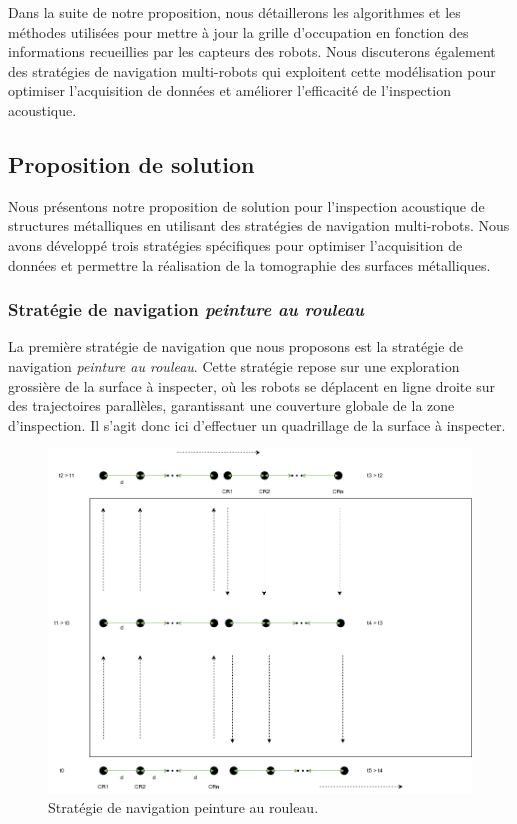 \documentclass[francais,RandD]{rapportPFE}
\begin{document}
			Dans la suite de notre proposition, nous détaillerons les algorithmes et les méthodes utilisées pour mettre à jour la grille d'occupation en fonction des informations recueillies par les capteurs des robots.
			Nous discuterons également des stratégies de navigation multi-robots qui exploitent cette modélisation pour optimiser l'acquisition de données et améliorer l'efficacité de l'inspection acoustique.
		\subsection{Proposition de solution}
			Nous présentons notre proposition de solution pour l'inspection acoustique de structures métalliques en utilisant des stratégies de navigation multi-robots.
			Nous avons développé trois stratégies spécifiques pour optimiser l'acquisition de données et permettre la réalisation de la tomographie des surfaces métalliques.
			\subsubsection*{Stratégie de navigation \textit{peinture au rouleau}}
				La première stratégie de navigation que nous proposons est la stratégie de navigation \textit{peinture au rouleau}.
				Cette stratégie repose sur une exploration grossière de la surface à inspecter, où les robots se déplacent en ligne droite sur des trajectoires parallèles, garantissant une couverture globale de la zone d'inspection.
				Il s'agit donc ici d'effectuer un quadrillage de la surface à inspecter.

				\begin{figure}[h!]
					\centering
					\includegraphics[scale=0.5]{graphics/peinture_au_rouleau1.png}
					\caption{Stratégie de navigation peinture au rouleau.}
					\label{fig:peinture_au_rouleau1}
				\end{figure}
\end{document}
